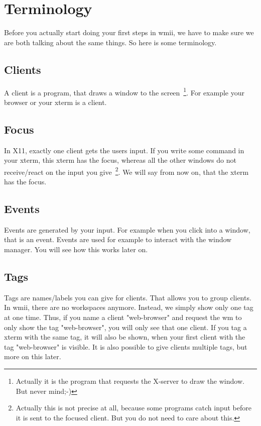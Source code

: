\documentclass[12pt,a4paper]{article} %
\begin{document}
\section{Terminology}
  
  Before you actually start doing your first steps in wmii, we have to
  make sure we are both talking about the same things. So here is some
  terminology.

  \subsection{Clients}

    A client is a program, that draws a window to the
    screen~\footnote{ Actually it is the program that requests the
    X-server to draw the window. But never mind;-)}.  For example your
    browser or your xterm is a client.
  
  \subsection{Focus}

    In X11, exactly one client gets the users input. If you write some
    command in your xterm, this xterm has the focus, whereas all the
    other windows do not receive/react on the input you
    give~\footnote{ Actually this is not precise at all, because some
    programs catch input before it is sent to the focused client. But
    you do not need to care about this.}.  We will say from now on,
    that the xterm has the focus.
  
  \subsection{Events}

    Events are generated by your input. For example when you click
    into a window, that is an event. Events are used for example to
    interact with the window manager. You will see how this works
    later on.
  
  \subsection{Tags}

    Tags are names/labels you can give for clients. That allows you to
    group clients.  In wmii, there are no workspaces anymore. Instead,
    we simply show only one tag at one time. Thus, if you name a
    client "web-browser" and request the wm to only show the tag
    "web-browser", you will only see that one client. If you tag a
    xterm with the same tag, it will also be shown, when your first
    client with the tag "web-browser" is visible. It is also possible
    to give clients multiple tags, but more on this later.
\end{document}
